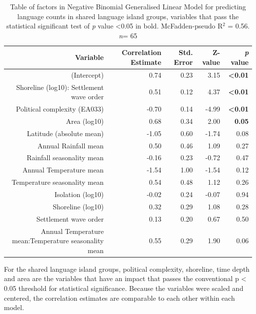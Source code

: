 \documentclass[a4paper,10pt]{article} %
\begin{document}
\begin{table}[ht]
\centering
\begin{tabular}{rrrrr}
  \hline
Variable & Correlation Estimate  & Std. Error & Z-value & \emph{p} value \\ 
  \hline
(Intercept) & 0.74 & 0.23 & 3.15 & \textbf{<0.01} \\ 
   Shoreline (log10): Settlement wave order & 0.51 & 0.12 & 4.37 &  \textbf{<0.01} \\ 
  Political complexity (EA033) & -0.70 & 0.14 & -4.99 &  \textbf{<0.01} \\ 
  Area (log10)& 0.68 & 0.34 & 2.00 & \textbf{0.05} \\ 
  Latitude (absolute mean) & -1.05 & 0.60 & -1.74 & 0.08 \\ 
  Annual Rainfall mean & 0.50 & 0.46 & 1.09 & 0.27 \\ 
  Rainfall seasonality mean  & -0.16 & 0.23 & -0.72 & 0.47 \\ 
  Annual Temperature mean & -1.54 & 1.00 & -1.54 & 0.12 \\ 
  Temperature seasonality mean& 0.54 & 0.48 & 1.12 & 0.26 \\ 
  Isolation (log10) & -0.02 & 0.24 & -0.07 & 0.94 \\ 
  Shoreline (log10)& 0.32 & 0.29 & 1.08 & 0.28 \\ 
   Settlement wave order & 0.13 & 0.20 & 0.67 & 0.50 \\ 
  Annual Temperature mean:Temperature seasonality mean& 0.55 & 0.29 & 1.90 & 0.06 \\ 
\end{tabular}
\caption[Table of factors in Negative Binomial Generalised Linear Model for predicting language counts in shared language island groups]{Table of factors in Negative Binomial Generalised Linear Model for predicting language counts in shared language island groups, variables that pass the statistical significant test of \emph{p} value <0.05 in bold. McFadden-pseudo R$^2$ = 0.56. \emph{n}= 65} 
\label{table:GLM_model_medium}
\end{table}

For the shared language island groups, political complexity, shoreline, time depth and area are the variables that have an impact that passes the conventional p < 0.05 threshold for statistical significance. Because the variables were scaled and centered, the correlation estimates are comparable to each other within each model.
\end{document}
